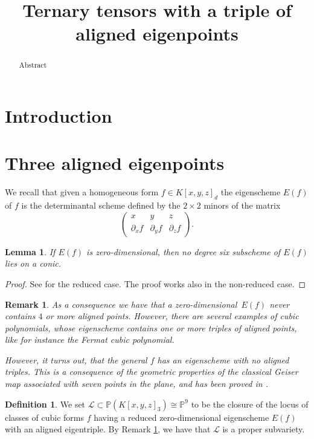 \documentclass{amsart}
\title{Ternary tensors with a triple of aligned eigenpoints}
\author{}
\date{}
\theoremstyle{plain}
\newtheorem{lem}[theorem]{Lemma}
\newtheorem{rmk}[theorem]{Remark}
\theoremstyle{definition}
\newtheorem{definition}[theorem]{Definition}
\newcommand{\p}{\mathbb{P}}
\newcommand{\sL}{\mathcal{L}}
\newcommand{\de}{\partial}
\begin{document}
\begin{abstract}
Abstract
\end{abstract}

\maketitle


\section{Introduction}
\section{Three aligned eigenpoints}
We recall that given a homogeneous form $f\in K[x,y,z]_d$ the eigenscheme $E(f)$ of $f$ is the determinantal scheme defined by the $2\times 2 $ minors of the matrix
%
\begin{equation} 
\label{eq:def_matrix}
    \begin{pmatrix}
    x & y & z \\
    \de_x f & \de_y f & \de_z f
    \end{pmatrix}.
\end{equation}
%   
\begin{lem}
If $E(f)$ is zero-dimensional, then
no degree six subscheme of $E(f)$ lies on a conic.
\end{lem}
\begin{proof}
See \cite[Lemma~9.1]{OS1} for the reduced case. The proof works also in the non-reduced case.
\end{proof}


\begin{rmk}\label{rmk: general no triple}
As a consequence we have that a zero-dimensional~$E(f)$ never contains $4$ or more aligned points. However, there are several examples of cubic polynomials, whose eigenscheme contains one or more triples of aligned points, like for instance the Fermat cubic polynomial.

However, it turns out, that the general $f$ has an eigenscheme with no aligned triples. This is a consequence of the geometric properties of the classical Geiser map associated with seven points in the plane, and has been proved in \cite[Proposition 4.5]{BGV}.
\end{rmk}

\begin{definition}
 We set $\mathcal{L} \subset \p(K[x,y,z]_3) \cong \p^9$ to be the closure of the locus of classes of cubic forms $f$ having a reduced zero-dimensional eigenscheme $E(f)$ with an aligned eigentriple.
 By Remark \ref{rmk: general no triple}, we have that $\sL$ is a proper subvariety.
\end{definition}
\end{document}
